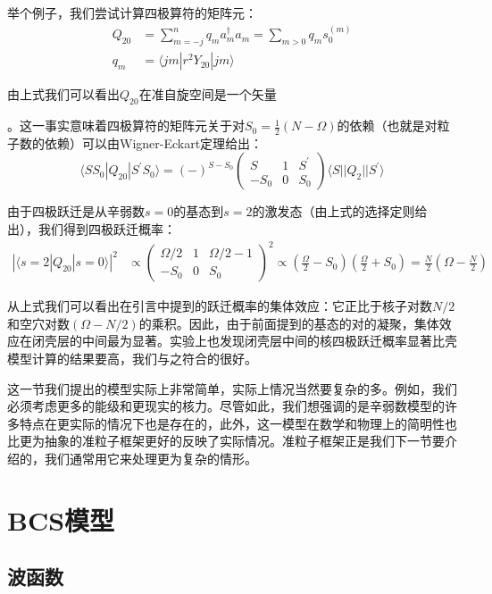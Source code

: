 举个例子，我们尝试计算四极算符的矩阵元：
\begin{align*}
Q_{20} & =\sum^{n}_{m=-j}q_{m}a^{\dagger}_{m}a_{m}=\sum_{m>0}q_{m}s^{(m)}_{0}\\
q_{m} & =\langle jm|r^{2}Y_{20}|jm\rangle
\end{align*}

由上式我们可以看出$Q_{20}$在准自旋空间是一个矢量

。这一事实意味着四极算符的矩阵元关于对$S_{0}=\frac{1}{2}(N-\Omega)$的依赖（也就是对粒子数的依赖）可以由Wigner-Eckart定理\cite{Ed57}给出：
\[
\langle SS_{0}|Q_{20}|S^{\prime}S_{0}\rangle=(-)^{S-S_{0}}\begin{pmatrix}S & 1 & S^{\prime}\\
-S_{0} & 0 & S_{0}
\end{pmatrix}\langle S||Q_{2}||S^{\prime}\rangle
\]

由于四极跃迁是从辛弱数$s=0$的基态到$s=2$的激发态（由上式的选择定则给出），我们得到四极跃迁概率：
\begin{align*}
\left|\langle s=2|Q_{20}|s=0\rangle\right|^{2} & \propto\begin{pmatrix}\Omega/2 & 1 & \Omega/2-1\\
-S_{0} & 0 & S_{0}
\end{pmatrix}^{2}\propto\left(\frac{\Omega}{2}-S_{0}\right)\left(\frac{\Omega}{2}+S_{0}\right)=\frac{N}{2}\left(\Omega-\frac{N}{2}\right)
\end{align*}

从上式我们可以看出在引言中提到的跃迁概率的集体效应：它正比于核子对数$N/2$和空穴对数$(\Omega-N/2)$的乘积。因此，由于前面提到的基态的对的凝聚，集体效应在闭壳层的中间最为显著。实验上也发现闭壳层中间的核四极跃迁概率显著比壳模型计算的结果要高，我们与之符合的很好。

这一节我们提出的模型实际上非常简单，实际上情况当然要复杂的多。例如，我们必须考虑更多的能级和更现实的核力。尽管如此，我们想强调的是辛弱数模型的许多特点在更实际的情况下也是存在的，此外，这一模型在数学和物理上的简明性也比更为抽象的准粒子框架更好的反映了实际情况。准粒子框架正是我们下一节要介绍的，我们通常用它来处理更为复杂的情形。

\section{BCS模型}

\subsection{波函数}

